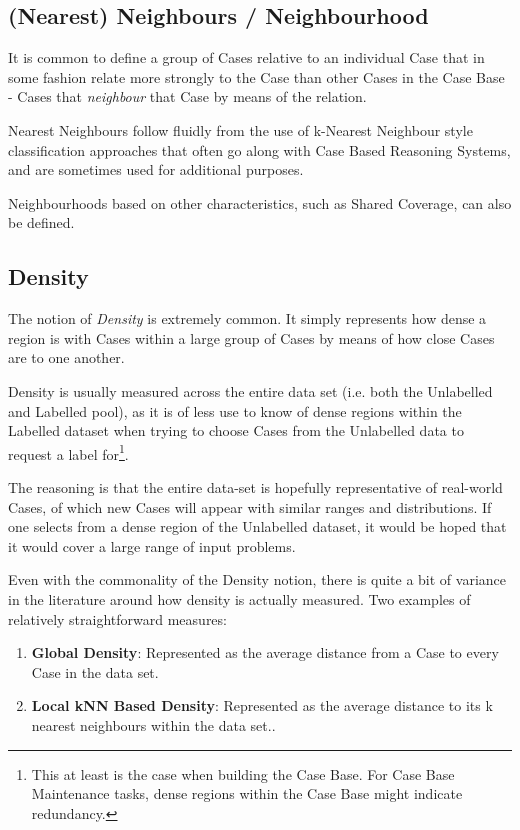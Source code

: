 \documentclass[a4paper,11pt]{report}
\begin{document}
\subsection{(Nearest) Neighbours / Neighbourhood}
It is common to define a group of Cases relative to an individual Case that in some fashion relate more strongly to the Case than other Cases in the Case Base - Cases that \emph{neighbour} that Case by means of the relation.

Nearest Neighbours follow fluidly from the use of k-Nearest Neighbour style classification approaches that often go along with Case Based Reasoning Systems, and are sometimes used for additional purposes.

Neighbourhoods based on other characteristics, such as Shared Coverage, can also be defined.

\subsection{Density}
The notion of \emph{Density} is extremely common. It simply represents how dense a region is with Cases within a large group of Cases by means of how close Cases are to one another.

Density is usually measured across the entire data set (i.e. both the Unlabelled and Labelled pool), as it is of less use to know of dense regions within the Labelled dataset when trying to choose Cases from the Unlabelled data to request a label for\footnote{This at least is the case when building the Case Base. For Case Base Maintenance tasks, dense regions within the Case Base might indicate redundancy.}. 

The reasoning is that the entire data-set is hopefully representative of real-world Cases, of which new Cases will appear with similar ranges and distributions. If one selects from a dense region of the Unlabelled dataset, it would be hoped that it would cover a large range of input problems.

Even with the commonality of the Density notion, there is quite a bit of variance in the literature around how density is actually measured. Two examples of relatively straightforward measures:
\begin{enumerate}
	\item \textbf{Global Density}: Represented as the average distance from a Case to every Case in the data set\cite{Xu2007}.
	\item \textbf{Local kNN Based Density}: Represented as the average distance to its k nearest neighbours within the data set.\cite{Zhu2008}.
\end{enumerate}
\end{document}
